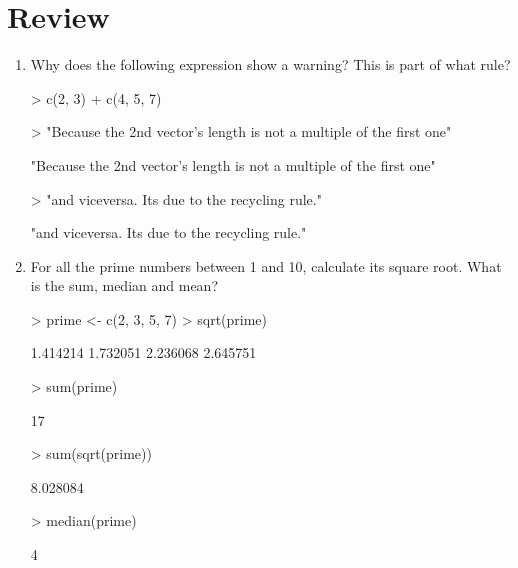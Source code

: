 \documentclass[letterpaper,12pt]{article}
\begin{document}
\section{Review}
  \begin{enumerate}
  \item Why does the following expression show a warning? This is part of what rule?
\begin{Schunk}
\begin{Sinput}
> c(2, 3) + c(4, 5, 7)
\end{Sinput}
\end{Schunk}
\begin{Schunk}
\begin{Sinput}
> "Because the 2nd vector's length is not a multiple of the first one"
\end{Sinput}
\begin{Soutput}
[1] "Because the 2nd vector's length is not a multiple of the first one"
\end{Soutput}
\begin{Sinput}
> "and viceversa. Its due to the recycling rule."
\end{Sinput}
\begin{Soutput}
[1] "and viceversa. Its due to the recycling rule."
\end{Soutput}
\end{Schunk}
  \item For all the prime numbers between 1 and 10, calculate its square root. What is the sum, median and mean?
\begin{Schunk}
\begin{Sinput}
> prime <- c(2, 3, 5, 7)
> sqrt(prime)
\end{Sinput}
\begin{Soutput}
[1] 1.414214 1.732051 2.236068 2.645751
\end{Soutput}
\begin{Sinput}
> sum(prime)
\end{Sinput}
\begin{Soutput}
[1] 17
\end{Soutput}
\begin{Sinput}
> sum(sqrt(prime))
\end{Sinput}
\begin{Soutput}
[1] 8.028084
\end{Soutput}
\begin{Sinput}
> median(prime)
\end{Sinput}
\begin{Soutput}
[1] 4
\end{Soutput}

\end{Schunk}
\end{enumerate}
\end{document}
